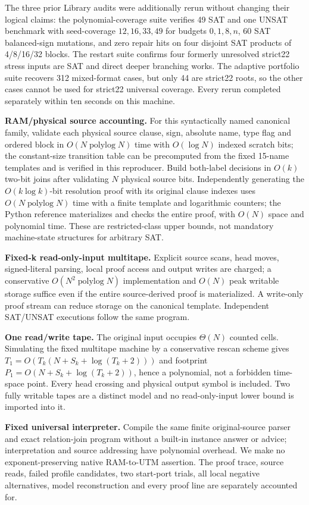 \documentclass[10pt]{article}
\begin{document}
The three prior Library audits were additionally rerun without changing their logical claims: the polynomial-coverage suite verifies 49 SAT and one UNSAT benchmark with seed-coverage $12,16,33,49$ for budgets $0,1,8,n$, 60 SAT balanced-sign mutations, and zero repair hits on four disjoint SAT products of 4/8/16/32 blocks. The restart suite confirms four formerly unresolved strict22 stress inputs are SAT and direct deeper branching works. The adaptive portfolio suite recovers 312 mixed-format cases, but only 44 are strict22 roots, so the other cases cannot be used for strict22 universal coverage. Every rerun completed separately within ten seconds on this machine.

\textbf{RAM/physical source accounting.} For this syntactically named canonical family, validate each physical source clause, sign, absolute name, type flag and ordered block in $O(N\operatorname{polylog}N)$ time with $O(\log N)$ indexed scratch bits; the constant-size transition table can be precomputed from the fixed 15-name templates and is verified in this reproducer. Build both-label decisions in $O(k)$ two-bit joins after validating $N$ physical source bits. Independently generating the $O(k\log k)$-bit resolution proof with its original clause indexes uses $O(N\operatorname{polylog}N)$ time with a finite template and logarithmic counters; the Python reference materializes and checks the entire proof, with $O(N)$ space and polynomial time. These are restricted-class upper bounds, not mandatory machine-state structures for arbitrary SAT.

\textbf{Fixed-k read-only-input multitape.} Explicit source scans, head moves, signed-literal parsing, local proof access and output writes are charged; a conservative $O(N^2\operatorname{polylog}N)$ implementation and $O(N)$ peak writable storage suffice even if the entire source-derived proof is materialized. A write-only proof stream can reduce storage on the canonical template. Independent SAT/UNSAT executions follow the same program.

\textbf{One read/write tape.} The original input occupies $\Theta(N)$ counted cells. Simulating the fixed multitape machine by a conservative rescan scheme gives $T_{1}=O(T_{k}(N+S_k+\log(T_k+2)))$ and footprint $P_1=O(N+S_k+\log(T_k+2))$, hence a polynomial, not a forbidden time-space point. Every head crossing and physical output symbol is included. Two fully writable tapes are a distinct model and no read-only-input lower bound is imported into it.

\textbf{Fixed universal interpreter.} Compile the same finite original-source parser and exact relation-join program without a built-in instance answer or advice; interpretation and source addressing have polynomial overhead. We make no exponent-preserving native RAM-to-UTM assertion. The proof trace, source reads, failed profile candidates, two start-port trials, all local negative alternatives, model reconstruction and every proof line are separately accounted for.
\end{document}
